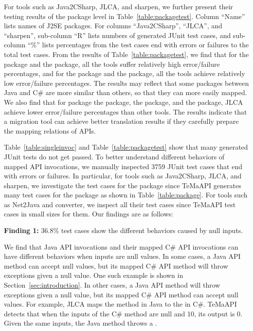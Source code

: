 For tools such as Java2CSharp, JLCA, and sharpen, we further present their testing results of the package level in Table~\ref{table:packagetest}. Column ``Name'' lists names of J2SE packages. For columns ``Java2CSharp'', ``JLCA'', and ``sharpen'', sub-column ``R'' lists numbers of generated JUnit test cases, and sub-column ``\%'' lists percentages from the test cases end with errors or failures to the total test cases. From the results of Table~\ref{table:packagetest}, we find that for the  package and the  package, all the tools suffer relatively high error/failure percentages, and for the  package and the  package, all the tools achieve relatively low error/failure percentages. The results may reflect that some packages between Java and C\# are more similar than others, so that they can more easily mapped. We also find that for package the  package, the  package, and the  package, JLCA achieve lower error/failure percentages than other tools. The results indicate that a migration tool can achieve better translation results if they carefully prepare the mapping relations of APIs.


Table~\ref{table:singleinvoc} and Table~\ref{table:packagetest} show that many generated JUnit tests do not get passed. To better understand different behaviors of mapped API invocations, we manually inspected 3759 JUnit test cases that end with errors or failures. In particular, for tools such as Java2CSharp, JLCA, and sharpen, we investigate the test cases for the  package since TeMaAPI generates many test cases for the package as shown in Table~\ref{table:package}. For tools such as Net2Java and converter, we inspect all their test cases since TeMaAPI test cases in small sizes for them. Our findings are as follows:

\textbf{Finding 1:} 36.8\% test cases show the different behaviors caused by null inputs.

We find that Java API invocations and their mapped C\# API invocations can have different behaviors when inputs are null values. In some cases, a Java API method can accept null values, but its mapped C\# API method will throw exceptions given a null value. One such example is shown in Section~\ref{sec:introduction}. In other cases, a Java API method will throw exceptions given a null value, but its mapped C\# API method can accept null values. For example, JLCA maps the  method in Java to the  in C\#. TeMaAPI detects that when the inputs of the C\# method are null and 10, its output is 0. Given the same inputs, the Java method throws a .

